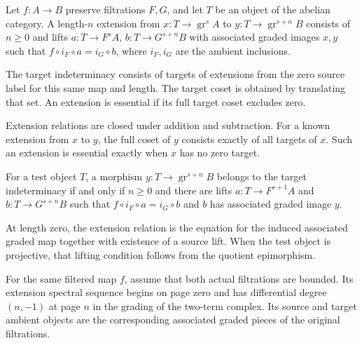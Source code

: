 \begin{definition}
\label{sem:SpectralSequence:extension-equation}
Let $f:A\to B$ preserve filtrations $F,G$, and let $T$ be an object of the abelian category. A length-$n$ extension from $x:T\to\operatorname{gr}^s A$ to $y:T\to\operatorname{gr}^{s+n}B$ consists of $n\geq0$ and lifts $a:T\to F^sA$, $b:T\to G^{s+n}B$ with associated graded images $x,y$ such that $f\circ i_F\circ a=i_G\circ b$, where $i_F,i_G$ are the ambient inclusions.

The target indeterminacy consists of targets of extensions from the zero source label for this same map and length. The target coset is obtained by translating that set. An extension is essential if its full target coset excludes zero.

Extension relations are closed under addition and subtraction. For a known extension from $x$ to $y$, the full coset of $y$ consists exactly of all targets of $x$. Such an extension is essential exactly when $x$ has no zero target.

For a test object $T$, a morphism $y:T\to\operatorname{gr}^{s+n}B$ belongs to the target indeterminacy if and only if $n\geq0$ and there are lifts $a:T\to F^{s+1}A$ and $b:T\to G^{s+n}B$ such that $f\circ i_F\circ a=i_G\circ b$ and $b$ has associated graded image $y$.

At length zero, the extension relation is the equation for the induced associated graded map together with existence of a source lift. When the test object is projective, that lifting condition follows from the quotient epimorphism.
\end{definition}


\begin{definition}[The bounded extension spectral sequence]
\label{sem:SpectralSequence:bounded-ess}
For the same filtered map $f$, assume that both actual filtrations are bounded. Its extension spectral sequence begins on page zero and has differential degree $(n,-1)$ at page $n$ in the grading of the two-term complex. Its source and target ambient objects are the corresponding associated graded pieces of the original filtrations.
\end{definition}

